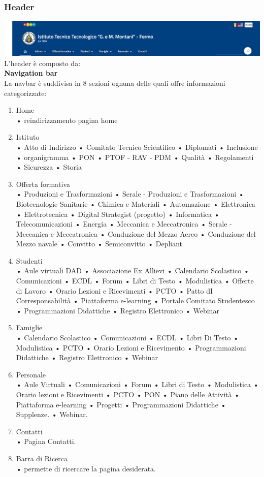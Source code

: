 \documentclass{article}
\begin{document}
	\subsubsection{\textbf{Header}}
	\includegraphics[scale=0.32]{navbar}\\
	L’header è composto da:\\
	\textbf{Navigation bar}\\
	La navbar è suddivisa in 8 sezioni ognuna delle quali offre informazioni categorizzate:\\
	\begin{enumerate}
		\item Home\\
		• reindirizzamento pagina home
		\item Istituto \\
		• Atto di Indirizzo
		• Comitato Tecnico Scientifico
		• Diplomati
		• Inclusione
		• organigramma
		• PON
		• PTOF - RAV - PDM
		• Qualità
		• Regolamenti 
		• Sicurezza 
		• Storia
		
		\item Offerta formativa\\
		• Produzioni e Trasformazioni
		• Serale - Produzioni e Trasformazioni
		• Biotecnologie Sanitarie
		• Chimica e Materiali
		• Automazione 
		• Elettronica 
		• Elettrotecnica
		• Digital Strategist (progetto)
		• Informatica
		• Telecomunicazioni
		• Energia 
		• Meccanica e Meccatronica
		• Serale - Meccanica e Meccatronica 
		• Conduzione del Mezzo Aereo 
		• Conduzione del Mezzo navale
		• Convitto
		• Semiconvitto 
		• Depliant 
		\item Studenti\\
		• Aule virtuali DAD
		• Associazione Ex Allievi 
		• Calendario Scolastico 
		• Comunicazioni 
		• ECDL
		• Forum
		• Libri di Testo 
		• Modulistica 
		• Offerte di Lavoro 
		• Orario Lezioni e Ricevimenti
		• PCTO
		• Patto dI Corresponsabilità
		• Piattaforma e-learning 
		• Portale Comitato Studentesco 
		• Programmazioni Didattiche 
		• Registro Elettronico
		• Webinar
		\item Famiglie\\
		• Calendario Scolastico
		• Comunicazioni
		• ECDL
		• Libri Di Testo 
		• Modulistica 
		• PCTO
		• Orario Lezioni e Ricevimento 
		• Programmazioni Didattiche
		• Registro Elettronico 
		• Webinar
		\item Personale\\
		• Aule Virtuali 
		• Comunicazioni
		• Forum
		• Libri di Testo
		• Modulistica
		• Orario lezioni e Ricevimenti
		• PCTO
		• PON
		• Piano delle Attività
		• Piattaforma e-learning
		• Progetti
		• Programmazioni Didattiche
		• Supplenze.
		• Webinar.
		\item Contatti\\
		• Pagina Contatti.
		\item Barra di Ricerca\\
		• permette di ricercare la pagina desiderata.
	\end{enumerate}
\end{document}
